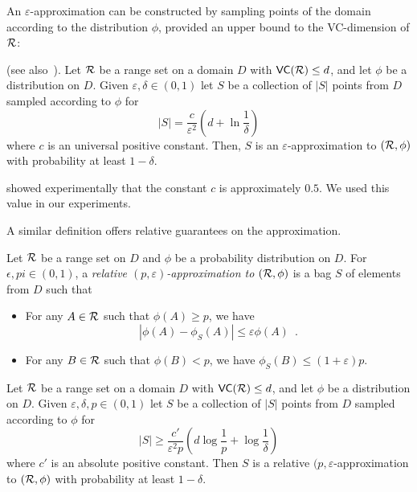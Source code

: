 An $\varepsilon$-approximation can be constructed by sampling points of
the domain according to the distribution $\phi$, provided an upper bound to the
VC-dimension of $\mathcal{R}$:

\begin{theorem}\label{thm:eapprox}
  (see also~\citep{LiLS01}). Let $\mathcal{R}$ be a range set on a domain $D$ with
  $\mathsf{VC}(\mathcal{R})\le d$, and let $\phi$ be a distribution on $D$. Given
  $\varepsilon,\delta\in(0,1)$ let $S$ be a collection of $|S|$ points from $D$
  sampled according to $\phi$ for
  \begin{equation}\label{eq:vceapprox}
	|S|=\frac{c}{\varepsilon^2}\left(d+\ln\frac{1}{\delta}\right)
  \end{equation}
  where $c$ is an universal positive constant. Then, $S$ is an
  $\varepsilon$-approximation to $(\mathcal{R},\phi)$ with probability at least
  $1-\delta$.
\end{theorem}
\citet{LofflerP09} showed experimentally that the constant $c$ is approximately
$0.5$. We used this value in our experiments.

A similar definition offers relative guarantees on the approximation.
\begin{definition}\label{def:releapprox}
  Let $\mathcal{R}$ be a range set on $D$ and $\phi$ be a probability distribution on
  $D$. For $\epsilon,pi\in (0,1)$, a \emph{relative
  $(p,\varepsilon)$-approximation to $(\mathcal{R},\phi)$} is a bag $S$ of elements
  from $D$ such that 
  \begin{itemize}
    \item For any $A\in\mathcal{R}$ such that $\phi(A)\ge p$, we have 
      \[ |\phi(A) - \phi_S(A)|\le \varepsilon\phi(A)\enspace.\]
    \item For any $B\in\mathcal{R}$ such that $\phi(B)< p$, we have $\phi_S(B)\le
      (1+\varepsilon)p$.
  \end{itemize}
\end{definition}

\begin{theorem}\label{thm:releapprox}
  Let $\mathcal{R}$ be a range set on a domain $D$ with
  $\mathsf{VC}(\mathcal{R})\le d$, and let $\phi$ be a distribution on $D$. Given
  $\varepsilon,\delta,p\in(0,1)$ let $S$ be a collection of $|S|$ points from $D$
  sampled according to $\phi$ for
  \begin{equation}\label{eq:releapprox}
    |S|\ge\frac{c'}{\varepsilon^2p}\left(d\log\frac{1}{p}+\log\frac{1}{\delta}\right)
  \end{equation}
  where $c'$ is an absolute positive constant. Then $S$ is a relative
  $(p,\varepsilon$-approximation to $(\mathcal{R},\phi)$ with probability at least
  $1-\delta$.
\end{theorem}


